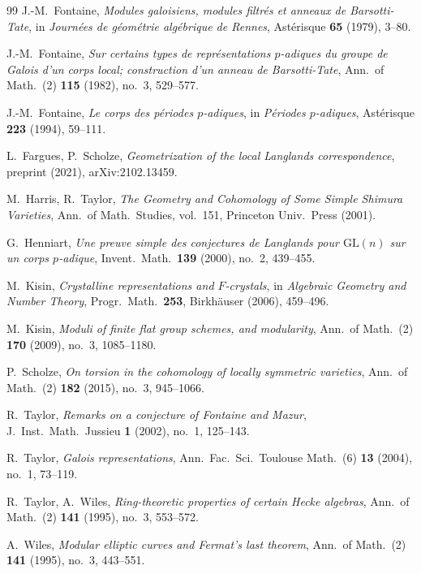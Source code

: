 \documentclass[12pt,a4paper]{amsart}
\theoremstyle{definition}
\theoremstyle{remark}
\begin{document}
\begin{thebibliography}{99}
J.-M.\ Fontaine,
\textit{Modules galoisiens, modules filtrés et anneaux de Barsotti-Tate},
in \textit{Journées de géométrie algébrique de Rennes}, Astérisque \textbf{65} (1979), 3--80.

J.-M.\ Fontaine,
\textit{Sur certains types de représentations $p$-adiques du groupe de Galois d'un corps local;
construction d'un anneau de Barsotti-Tate},
Ann.\ of Math.\ (2) \textbf{115} (1982), no.\ 3, 529--577.

J.-M.\ Fontaine,
\textit{Le corps des périodes $p$-adiques},
in \textit{Périodes $p$-adiques}, Astérisque \textbf{223} (1994), 59--111.

L.\ Fargues, P.\ Scholze,
\textit{Geometrization of the local Langlands correspondence},
preprint (2021), arXiv:2102.13459.

M.\ Harris, R.\ Taylor,
\textit{The Geometry and Cohomology of Some Simple Shimura Varieties},
Ann.\ of Math.\ Studies, vol.\ 151, Princeton Univ.\ Press (2001).

G.\ Henniart,
\textit{Une preuve simple des conjectures de Langlands pour $\mathrm{GL}(n)$ sur un corps $p$-adique},
Invent.\ Math.\ \textbf{139} (2000), no.\ 2, 439--455.

M.\ Kisin,
\textit{Crystalline representations and $F$-crystals},
in \textit{Algebraic Geometry and Number Theory}, Progr.\ Math.\ \textbf{253},
Birkhäuser (2006), 459--496.

M.\ Kisin,
\textit{Moduli of finite flat group schemes, and modularity},
Ann.\ of Math.\ (2) \textbf{170} (2009), no.\ 3, 1085--1180.

P.\ Scholze,
\textit{On torsion in the cohomology of locally symmetric varieties},
Ann.\ of Math.\ (2) \textbf{182} (2015), no.\ 3, 945--1066.

R.\ Taylor,
\textit{Remarks on a conjecture of Fontaine and Mazur},
J.\ Inst.\ Math.\ Jussieu \textbf{1} (2002), no.\ 1, 125--143.

R.\ Taylor,
\textit{Galois representations},
Ann.\ Fac.\ Sci.\ Toulouse Math.\ (6) \textbf{13} (2004), no.\ 1, 73--119.

R.\ Taylor, A.\ Wiles,
\textit{Ring-theoretic properties of certain Hecke algebras},
Ann.\ of Math.\ (2) \textbf{141} (1995), no.\ 3, 553--572.

A.\ Wiles,
\textit{Modular elliptic curves and Fermat's last theorem},
Ann.\ of Math.\ (2) \textbf{141} (1995), no.\ 3, 443--551.

\end{thebibliography}
\end{document}
